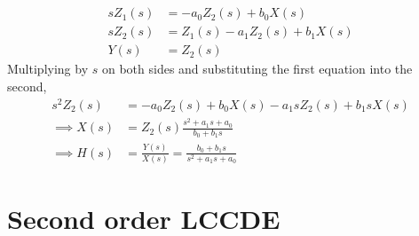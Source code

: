 \documentclass{article}
\begin{document}
\subsection{}

\begin{align}
    s Z_1(s) &= -a_0 Z_2(s) + b_0 X(s) \\
    s Z_2(s) &= Z_1(s) - a_1 Z_2(s) + b_1 X(s) \\
    Y(s) &= Z_2(s)
\end{align}
Multiplying by \(s\) on both sides and substituting the first equation into the second,
\begin{align}
    s^2 Z_2(s) &= -a_0 Z_2(s) + b_0 X(s) - a_1 s Z_2(s) + b_1 s X(s) \\
    \implies X(s) &= Z_2(s) \frac{s^2 + a_1 s + a_0}{b_0 + b_1 s} \\
    \implies H(s) &= \frac{Y(s)}{X(s)} = \frac{b_0 + b_1 s}{s^2 + a_1 s + a_0}
\end{align}

\section{Second order LCCDE}
\end{document}
